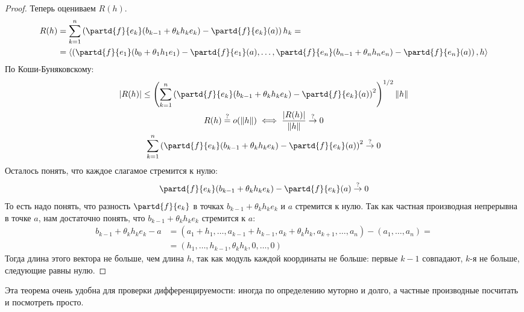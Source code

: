 \begin{proof}
	Теперь оцениваем $R(h)$.
	\begin{align*}
	R(h) &= \sum_{k=1}^n \left( \partd{f}{e_k} (b_{k-1}+\theta_k h_k e_k) - \partd{f}{e_k}(a) \right)h_k = \\
			 &= \left<\left(\partd{f}{e_1}(b_0+\theta_1 h_1 e_1) - \partd{f}{e_1}(a), \dots, \partd{f}{e_n}(b_{n-1}+\theta_n h_n e_n) - \partd{f}{e_n}(a) \right), h\right>
	\end{align*}
	По Коши-Буняковскому:
	\begin{gather*}
	|R(h)| \le \left( \sum_{k=1}^n \left( \partd{f}{e_k} (b_{k-1}+\theta_k h_k e_k) - \partd{f}{e_k}(a) \right)^2 \right)^{1/2} \|h\| \\
	R(h) \stackrel?= o(\|h\|) \iff \frac{|R(h)|}{\|h\|} \stackrel{?}{\to} 0 \\
	\sum_{k=1}^n \left( \partd{f}{e_k} (b_{k-1}+\theta_k h_k e_k) - \partd{f}{e_k}(a) \right)^2 \stackrel{?}{\to} 0
	\end{gather*}
	Осталось понять, что каждое слагамое стремится к нулю:
	\[
	\partd{f}{e_k} (b_{k-1}+\theta_k h_k e_k) - \partd{f}{e_k}(a) \stackrel{?}{\to} 0
	\]
	То есть надо понять, что разность $\partd{f}{e_k}$ в точках $b_{k-1}+\theta_k h_k e_k$ и $a$ стремится к нулю.
	Так как частная производная непрерывна в точке $a$, нам достаточно понять, что $b_{k-1}+\theta_k h_k e_k$ стремится к $a$:
	\begin{align*}
	b_{k-1}+\theta_k h_k e_k - a &= (a_1+h_1, \dots, a_{k-1}+h_{k-1}, a_k + \theta_k h_k, a_{k+1}, \dots, a_n) - (a_1, \dots, a_n) = \\
	                         &= (h_1, \dots, h_{k-1}, \theta_k h_k, 0, \dots, 0)
	\end{align*}
	Тогда длина этого вектора не больше, чем длина $h$, так как модуль каждой координаты не больше:
	первые $k-1$ совпадают, $k$-я не больше, следующие равны нулю.

\end{proof}
\begin{Rem}
	Эта теорема очень удобна для проверки дифференцируемости: иногда по определению муторно и долго, а частные производные посчитать и посмотреть просто.
\end{Rem}

